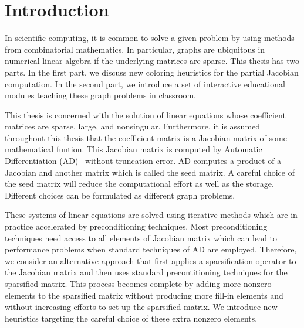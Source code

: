 \documentclass[12pt, twoside,a4paper,toc=bibliography]{scrbook}
\begin{document}
\tableofcontents
\chapter{Introduction}
In scientific computing, it is common to solve a given problem by using methods from combinatorial mathematics.
In particular, graphs are ubiquitous in numerical linear algebra if the underlying matrices are sparse.
This thesis has two parts.
In the first part, we discuss new coloring heuristics for the partial Jacobian computation.
In the second part, we introduce a set of interactive educational modules teaching these graph problems in classroom.

This thesis is concerned with 
the solution of linear equations whose coefficient matrices are sparse, large, and nonsingular.
Furthermore, it is assumed throughout this thesis that the coefficient matrix is a
Jacobian matrix of some mathematical funtion.
This Jacobian matrix is computed by Automatic Differentiation (AD)~\cite{Griewank2008EDP,Rall1981ADT} without truncation error.
AD computes a product of a Jacobian and another matrix which is called the seed matrix.
A careful choice of the seed matrix will reduce the computational effort as well as 
the storage. Different choices can be formulated as different graph problems.

These systems of linear equations are solved using iterative methods which are in practice accelerated by preconditioning techniques.
Most preconditioning techniques need access to all elements of Jacobian matrix which
can lead to performance problems when standard techniques of AD are employed.
Therefore, we consider an alternative approach that first applies a sparsification operator to the Jacobian matrix and then
uses standard precontitioning techniques for the sparsified matrix.
This process becomes complete by adding more nonzero elements to the sparsified matrix
without producing more fill-in elements and without increasing efforts to set up the sparsified matrix.
We introduce new heuristics targeting the careful choice of these extra nonzero elements.
\end{document}
